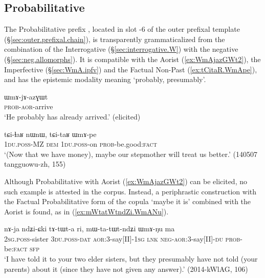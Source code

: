 \subsection{Probabilitative} \label{sec:WmA}
The Probabilitative prefix , located in slot -6 of the outer prefixal template (§\ref{sec:outer.prefixal.chain}), is transparently grammaticalized from the combination of the Interrogative  (§\ref{sec:interrogative.W}) with the negative  (§\ref{sec:neg.allomorphs}). It is compatible with the Aorist  (\ref{ex:WmAjazGWt2}), the Imperfective (§\ref{sec:WmA.ipfv}) and the Factual Non-Past (\ref{ex:tCitaR.WmApe}), and has the epistemic modality meaning `probably, presumably'.

 \begin{exe}
 \ex \label{ex:WmAjazGWt2}
\gll ɯmɤ-jɤ-azɣɯt  \\
\textsc{prob}-\textsc{aor}-arrive \\
\glt `He probably has already arrived.' (elicited)
\end{exe}

 \begin{exe}
 \ex \label{ex:tCitaR.WmApe}
\gll tɕi-ɬaʁ nɯnɯ, tɕi-taʁ ɯmɤ-pe \\
\textsc{1du}.\textsc{poss}-MZ \textsc{dem} \textsc{1du}.\textsc{poss}-on \textsc{prob}-be.good:\textsc{fact} \\
\glt `(Now that we have money), maybe our stepmother will treat us better.' (140507 tangguowu-zh, 155)
\end{exe}

Although Probabilitative with Aorist (\ref{ex:WmAjazGWt2}) can be elicited, no such example is attested in the corpus. Instead, a periphrastic construction with the Factual Probabilitative form of the copula  `maybe it is' combined with the Aorist is found, as in (\ref{ex:mWtatWtndZi.WmANu}).
 
 \begin{exe}
 \ex \label{ex:mWtatWtndZi.WmANu}
\gll nɤ-ja ndʑi-ɕki tɤ-tɯt-a ri, mɯ-ta-tɯt-ndʑi ɯmɤ-ŋu ma \\
\textsc{2sg}.\textsc{poss}-sister \textsc{3du}.\textsc{poss}-\textsc{dat} \textsc{aor}:3\flobv{}-say[II]-\textsc{1sg} \textsc{lnk} \textsc{neg}-\textsc{aor}:3\flobv{}-say[II]-\textsc{du} \textsc{prob}-be:\textsc{fact} \textsc{sfp} \\
\glt `I have told it to your two elder sisters, but they presumably have not told (your parents) about it (since they have not given any answer).' (2014-kWlAG, 106)
\end{exe}

